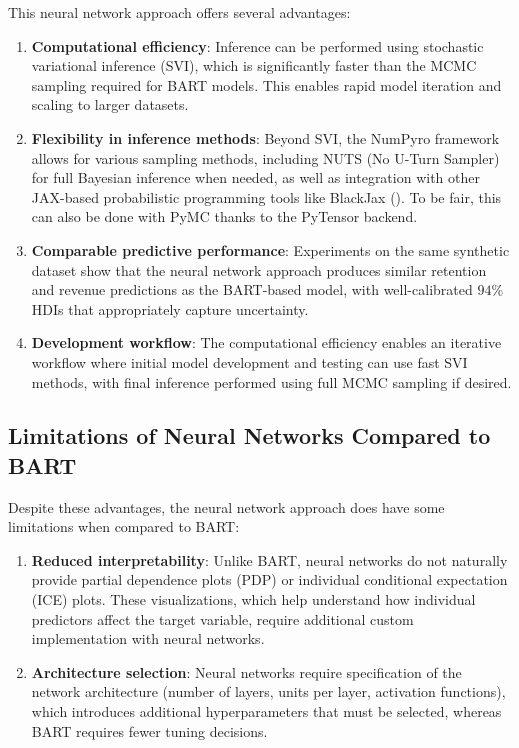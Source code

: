 \documentclass[11pt]{amsart}
\theoremstyle{definition}
\begin{document}
This neural network approach offers several advantages:

\begin{enumerate}
    \item \textbf{Computational efficiency}: Inference can be performed using stochastic variational inference (SVI), which
          is significantly faster than the MCMC sampling required for BART models. This enables rapid model iteration and
          scaling to larger datasets.

    \item \textbf{Flexibility in inference methods}: Beyond SVI, the NumPyro framework allows for various sampling methods,
          including NUTS (No U-Turn Sampler) for full Bayesian inference when needed, as well as integration with other
          JAX-based probabilistic programming tools like BlackJax (\cite{cabezas2024blackjax}). To be fair, this can
          also be done with PyMC thanks to the PyTensor backend.

    \item \textbf{Comparable predictive performance}: Experiments on the same synthetic dataset show that the neural network
          approach produces similar retention and revenue predictions as the BART-based model, with well-calibrated $94\%$ HDIs
          that appropriately capture uncertainty.

    \item \textbf{Development workflow}: The computational efficiency enables an iterative workflow where initial model
          development and testing can use fast SVI methods, with final inference performed using full MCMC sampling if desired.
\end{enumerate}

\subsection{Limitations of Neural Networks Compared to BART}

Despite these advantages, the neural network approach does have some limitations when compared to BART:

\begin{enumerate}
    \item \textbf{Reduced interpretability}: Unlike BART, neural networks do not naturally provide partial dependence plots
          (PDP) or individual conditional expectation (ICE) plots. These visualizations, which help understand how individual
          predictors affect the target variable, require additional custom implementation with neural networks.

    \item \textbf{Architecture selection}: Neural networks require specification of the network architecture (number of
          layers, units per layer, activation functions), which introduces additional hyperparameters that must be selected,
          whereas BART requires fewer tuning decisions.
\end{enumerate}
\end{document}
